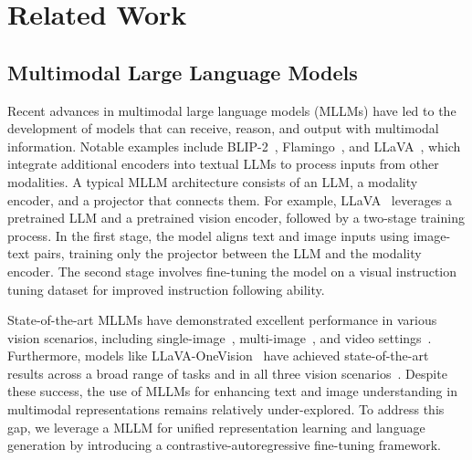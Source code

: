 \section{Related Work}\label{sec:related_work}

\subsection{Multimodal Large Language Models}
Recent advances in multimodal large language models (MLLMs) have led to the development of models that can receive, reason, and output with multimodal information. 
%
Notable examples include BLIP-2~\citep{li2023blip}, Flamingo~\citep{alayrac2022flamingo}, and LLaVA~\citep{liu2024visual}, which integrate additional encoders into textual LLMs to process inputs from other modalities. 
%
A typical MLLM architecture consists of an LLM, a modality encoder, and a projector that connects them. 
%
For example, LLaVA~\citep{liu2024visual} leverages a pretrained LLM and a pretrained vision encoder, followed by a two-stage training process. 
%
In the first stage, the model aligns text and image inputs using image-text pairs, training only the projector between the LLM and the modality encoder. 
%
The second stage involves fine-tuning the model on a visual instruction tuning dataset for improved instruction following ability.
%

State-of-the-art MLLMs have demonstrated excellent performance in various vision scenarios, including single-image~\citep{dai2023instructblip,zhu2023minigpt,zhang2024llamaadapter}, multi-image~\citep{jiang2405mantis,li2023empowering,li2023fine}, and video settings~\citep{li2025llama,lin2023video, zhang2024beyond}. 
%
Furthermore, models like LLaVA-OneVision~\citep{li2024llava} have achieved state-of-the-art results across a broad range of tasks and in all three vision scenarios~\citep{li2024llavanext,zhang2024internlm}. 
%
Despite these success, the use of MLLMs for enhancing text and image understanding in multimodal representations remains relatively under-explored. 
%
To address this gap, we leverage a MLLM for unified representation learning and language generation by introducing a contrastive-autoregressive fine-tuning framework.


